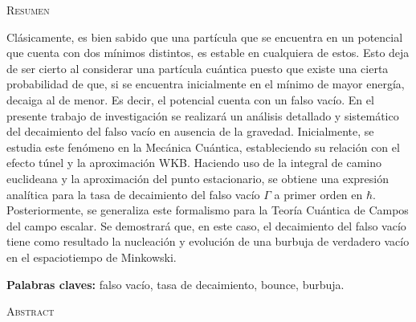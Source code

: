 \documentclass[12pt, a4paper, oneside]{book}
\begin{document}

\begin{center}
	\thispagestyle{plain}
	\setlength{\parskip}{0pt}
	{\huge{\textsc{Resumen}} \par}

\end{center}

\noindent
Clásicamente, es bien sabido que una partícula que se encuentra en un potencial que cuenta con dos mínimos distintos, es estable en cualquiera de estos. Esto deja de ser cierto al considerar una partícula cuántica puesto que existe una cierta probabilidad de que, si se encuentra inicialmente en el mínimo de mayor energía, decaiga al de menor. Es decir, el potencial cuenta con un falso vacío.  En el presente trabajo de investigación se realizará un análisis detallado y sistemático del decaimiento del falso vacío en ausencia de la gravedad. Inicialmente, se estudia este fenómeno 
en la Mecánica Cuántica, estableciendo su relación con el efecto túnel y la aproximación WKB. Haciendo uso de la 
integral de camino euclideana y la aproximación del punto estacionario, se obtiene una expresión analítica para la tasa de decaimiento del falso vacío $\Gamma$ a primer orden en $\hbar$.
Posteriormente, se generaliza este formalismo para la Teoría Cuántica de Campos del campo escalar. Se demostrará que, en este caso, el decaimiento del falso vacío tiene como resultado la nucleación y evolución de una burbuja de verdadero vacío en el espaciotiempo de Minkowski.

\hfill

\noindent
\textbf{Palabras claves:} falso vacío, tasa de decaimiento, bounce, burbuja.


\newpage


\begin{center}
	\thispagestyle{plain}
	\setlength{\parskip}{0pt}
	{\huge{\textsc{Abstract}} \par}
	
\end{center}
\end{document}
